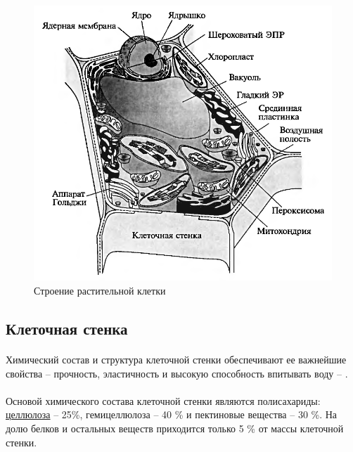 \begin{figure}
  \centering
       \includegraphics[width=0.5\linewidth]{pictures/plant_cell}
\caption{Строение растительной клетки}
\label{cell_shema}
\end{figure}


\subsection*{Клеточная стенка}

\paragraph*{}Химический состав и структура \hypertarget{cell_wall}{клеточной стенки} обеспечивают ее важнейшие свойства -- прочность, эластичность и высокую способность впитывать воду -- .

\paragraph*{}Основой химического состава клеточной стенки являются полисахариды: \hyperlink{cellulosa}{целлюлоза} -- 25\%, гемицеллюлоза -- 40 \% и пектиновые вещества -- 30 \%. На долю белков и остальных веществ приходится только 5 \% от массы клеточной стенки. 

